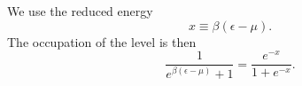 \documentclass{article}
\begin{document}
We use the reduced energy
\begin{equation}
x \equiv \beta(\epsilon-\mu) .
\label{eq:x}
\end{equation}
The occupation of the level is then
\begin{equation}
\frac{1}{e^{\beta(\epsilon-\mu)}+1} = \frac{e^{-x}}{1+e^{-x}} .
\label{eq:occ}
\end{equation}
\end{document}
